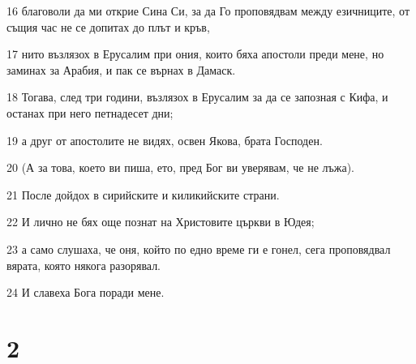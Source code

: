 \par 16 благоволи да ми открие Сина Си, за да Го проповядвам между езичниците, от същия час не се допитах до плът и кръв,
\par 17 нито възлязох в Ерусалим при ония, които бяха апостоли преди мене, но заминах за Арабия, и пак се върнах в Дамаск.
\par 18 Тогава, след три години, възлязох в Ерусалим за да се запозная с Кифа, и останах при него петнадесет дни;
\par 19 а друг от апостолите не видях, освен Якова, брата Господен.
\par 20 (А за това, което ви пиша, ето, пред Бог ви уверявам, че не лъжа).
\par 21 После дойдох в сирийските и киликийските страни.
\par 22 И лично не бях още познат на Христовите църкви в Юдея;
\par 23 а само слушаха, че оня, който по едно време ги е гонел, сега проповядвал вярата, която някога разорявал.
\par 24 И славеха Бога поради мене.

\chapter{2}

